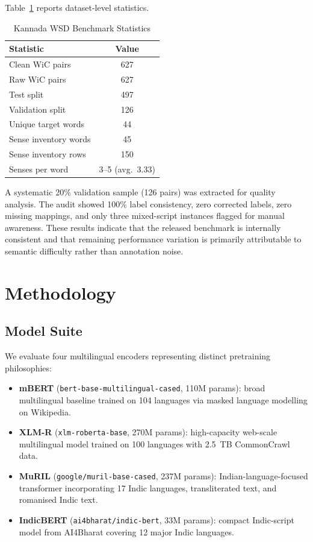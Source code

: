 \documentclass{ieeeaccess}
\begin{document}
Table~\ref{tab:datasetstats} reports dataset-level statistics.

\begin{table}[t!]
\centering
\caption{Kannada WSD Benchmark Statistics}
\label{tab:datasetstats}
\begin{tabular}{lc}
\toprule
\textbf{Statistic} & \textbf{Value}\\
\midrule
Clean WiC pairs       & 627 \\
Raw WiC pairs         & 627 \\
Test split            & 497 \\
Validation split      & 126 \\
Unique target words   & 44 \\
Sense inventory words & 45 \\
Sense inventory rows  & 150 \\
Senses per word       & 3--5 (avg.\ 3.33)\\
\bottomrule
\end{tabular}
\end{table}

A systematic 20\% validation sample (126 pairs) was extracted for
quality analysis.
The audit showed 100\% label consistency, zero corrected labels, zero missing
mappings, and only three mixed-script instances flagged for manual awareness.
These results indicate that the released benchmark is internally consistent and
that remaining performance variation is primarily attributable to semantic
difficulty rather than annotation noise.

\section{Methodology}
\label{sec:method}

\subsection{Model Suite}

We evaluate four multilingual encoders representing distinct pretraining
philosophies:
\begin{itemize}
  \item \textbf{mBERT} (\texttt{bert-base-multilingual-cased}, 110M params):
        broad multilingual baseline trained on 104 languages via masked
        language modelling on Wikipedia.
  \item \textbf{XLM-R} (\texttt{xlm-roberta-base}, 270M params):
        high-capacity web-scale multilingual model trained on 100 languages
        with 2.5~TB CommonCrawl data.
  \item \textbf{MuRIL} (\texttt{google/muril-base-cased}, 237M params):
        Indian-language-focused transformer incorporating 17 Indic languages,
        transliterated text, and romanised Indic text.
  \item \textbf{IndicBERT} (\texttt{ai4bharat/indic-bert}, 33M params):
        compact Indic-script model from AI4Bharat covering 12 major Indic
        languages.
\end{itemize}
\end{document}
